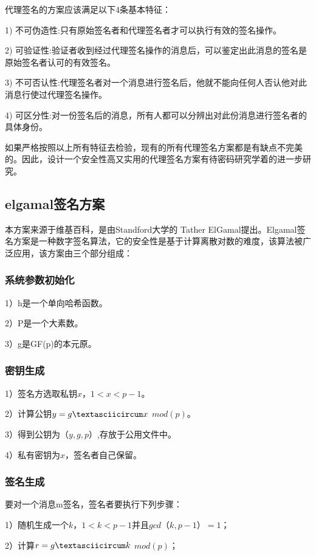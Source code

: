 代理签名的方案应该满足以下4条基本特征：

1) 不可伪造性:只有原始签名者和代理签名者才可以执行有效的签名操作。 

2) 可验证性:验证者收到经过代理签名操作的消息后，可以鉴定出此消息的签名是原始签名者认可的有效签名。

3) 不可否认性:代理签名者对一个消息进行签名后，他就不能向任何人否认他对此消息行使过代理签名操作。

4) 可区分性:对一份签名后的消息，所有人都可以分辨出对此份消息进行签名者的具体身份。 

如果严格按照以上所有特征去检验，现有的所有代理签名方案都是有缺点不完美的。因此，设计一个安全性高又实用的代理签名方案有待密码研究学着的进一步研究。

\subsection{elgamal签名方案}

本方案来源于维基百科，是由Standford大学的 Tather ElGamal提出。Elgamal签名方案是一种数字签名算法，它的安全性是基于计算离散对数的难度，该算法被广泛应用，该方案由三个部分组成：

\subsubsection{系统参数初始化}

1）h是一个单向哈希函数。

2）P是一个大素数。

3）g是GF(p)的本元原。

\subsubsection{密钥生成}

1）签名方选取私钥$x$，$1<x<p-1$。

2）计算公钥$y=g \textasciicircum x$ $mod(p)$。

3）得到公钥为$（y,g,p）$,存放于公用文件中。

4）私有密钥为$x$，签名者自己保留。

\subsubsection{签名生成}

要对一个消息m签名，签名者要执行下列步骤：

1）随机生成一个$k$，$1<k<p-1$并且$gcd（k,p-1）=1$；

2）计算$r=g \textasciicircum k$ $mod(p)$；

